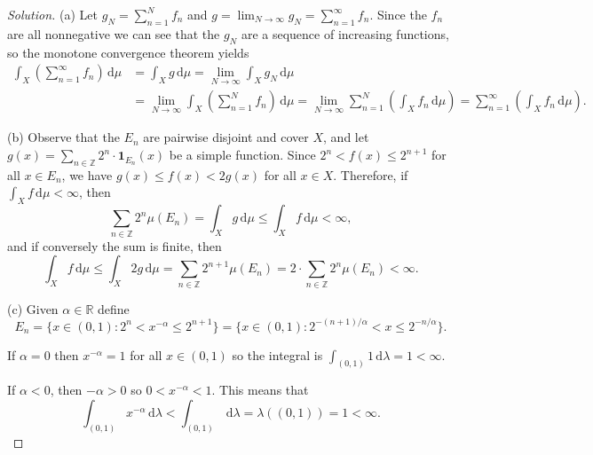 \documentclass[10pt]{article}
\newcommand{\dd}{\,\mathrm{d}}
\providecommand{\RR}{\mathbb R}
\providecommand{\ZZ}{\mathbb Z}
\newenvironment{soln}{\begin{proof}[Solution]}{\end{proof}}
\begin{document}
\begin{soln}
    (a) Let $g_N = \sum_{n=1}^N f_n$ and
    $g = \lim_{N\to\infty} g_N = \sum_{n=1}^\infty f_n$.
    Since the $f_n$ are all nonnegative we can see that
    the $g_N$ are a sequence of increasing functions,
    so the monotone convergence theorem yields
    \begin{align*}
	\int_X \left(\sum_{n=1}^\infty f_n\right)\dd\mu
	&= \int_X g\dd\mu
	= \lim_{N\to\infty} \int_X g_N\dd\mu\\
	&= \lim_{N\to\infty} \int_X \left(\sum_{n=1}^N f_n\right)\dd\mu
	= \lim_{N\to\infty} \sum_{n=1}^N\left(\int_X f_n\dd\mu\right)
	= \sum_{n=1}^\infty \left(\int_X f_n\dd\mu\right).
    \end{align*}

    (b) Observe that the $E_n$ are pairwise disjoint and cover $X$,
    and let $g(x) = \sum_{n\in\ZZ} 2^n\cdot\mathbf 1_{E_n}(x)$
    be a simple function. Since $2^n < f(x) \le 2^{n+1}$ for all $x\in E_n$,
    we have $g(x) \le f(x) < 2g(x)$ for all $x\in X$.
    Therefore, if $\int_X f\dd\mu < \infty$, then
    \begin{equation*}
	\sum_{n\in\ZZ}2^n\mu(E_n) =
	\int_X g\dd\mu \le \int_X f\dd\mu < \infty,
    \end{equation*}
    and if conversely the sum is finite, then
    \begin{equation*}
	\int_X f\dd\mu \le \int_X 2g\dd\mu = \sum_{n\in\ZZ}2^{n+1}\mu(E_n)
	= 2\cdot\sum_{n\in\ZZ}2^n\mu(E_n) < \infty.
    \end{equation*}
    \pagebreak

    (c) Given $\alpha\in\RR$ define
    \begin{equation*}
	E_n = \{x\in (0,1) : 2^n < x^{-\alpha} \le 2^{n+1}\}
	= \{x\in (0,1) : 2^{-(n+1)/\alpha} < x \le 2^{-n/\alpha}\}.
    \end{equation*}

    If $\alpha=0$ then $x^{-\alpha} = 1$ for all $x\in(0,1)$
    so the integral is $\int_{(0,1)}1\dd\lambda = 1 < \infty$.

    If $\alpha < 0$, then $-\alpha > 0$ so $0 < x^{-\alpha} < 1$.
    This means that
    \begin{equation*}
	\int_{(0,1)} x^{-\alpha}\dd\lambda < \int_{(0,1)} \dd\lambda
	= \lambda((0,1)) = 1 < \infty.
    \end{equation*}


\end{soln}
\end{document}
